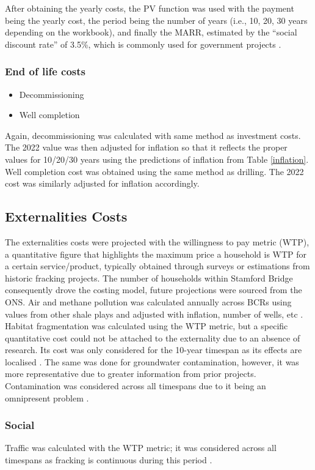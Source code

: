 \documentclass[10pt]{article}
\begin{document}
After obtaining the yearly costs, the PV function was used with the payment being the yearly cost, the period being the number of years (i.e., 10, 20, 30 years depending on the workbook), and finally the MARR, estimated by the ``social discount rate'' of 3.5\%, which is commonly used for government projects \cite{013}.
\subsubsection{End of life costs}
\begin{itemize}
    \item Decommissioning
    \item Well completion
\end{itemize}
Again, decommissioning was calculated with same method as investment costs. The 2022 value was then adjusted for inflation so that it reflects the proper values for 10/20/30 years using the predictions of inflation from Table \ref{inflation}. Well completion cost was obtained using the same method as drilling. The 2022 cost was similarly adjusted for inflation accordingly.
\subsection{Externalities Costs}
The externalities costs were projected with the willingness to pay metric (WTP), a quantitative figure that highlights the maximum price a household is WTP for a certain service/product, typically obtained through surveys or estimations from historic fracking projects. The number of households within Stamford Bridge consequently drove the costing model, future projections were sourced from the ONS. Air and methane pollution was calculated annually across BCRs using values from other shale plays and adjusted with inflation, number of wells, etc \cite{013}. Habitat fragmentation was calculated using the WTP metric, but a specific quantitative cost could not be attached to the externality due to an absence of research. Its cost was only considered for the 10-year timespan as its effects are localised \cite{LOOMIS2017160}. The same was done for groundwater contamination, however, it was more representative due to greater information from prior projects. Contamination was considered across all timespans due to it being an omnipresent problem \cite{013}.
\subsubsection{Social}
Traffic was calculated with the WTP metric; it was considered across all timespans as fracking is continuous during this period \cite{013}.
\end{document}
